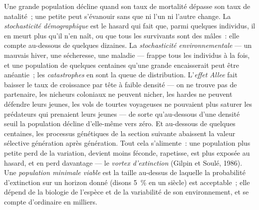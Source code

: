 \begin{definition}\label{def:b3:conservation-biology:small}
Une grande population décline quand son taux de mortalité dépasse son
taux de natalité~; une petite peut s'évanouir sans que ni l'un ni
l'autre change. La \emph{stochasticité démographique} est le hasard
qui fait que, parmi quelques individus, il en meurt plus qu'il n'en
naît, ou que tous les survivants sont des mâles~: elle compte au-dessous
de quelques dizaines. La \emph{stochasticité environnementale} --- un
mauvais hiver, une sécheresse, une maladie --- frappe tous les individus
à la fois, et une population de quelques centaines qu'une grande
encaisserait peut être anéantie~; les \emph{catastrophes} en sont la
queue de distribution. L'\emph{effet Allee} fait baisser le taux de
croissance par tête à faible densité --- on ne trouve pas de partenaire,
les nicheurs coloniaux ne peuvent nicher, les hardes ne peuvent défendre
leurs jeunes, les vols de tourtes voyageuses ne pouvaient plus saturer
les prédateurs qui prenaient leurs jeunes --- de sorte qu'au-dessous
d'une densité seuil la population décline d'elle-même vers zéro. Et
au-dessous de quelques centaines, les processus génétiques de la section
suivante abaissent la valeur sélective génération après génération. Tout
cela s'alimente~: une population plus petite perd de la variation,
devient moins féconde, rapetisse, est plus exposée au hasard, et en perd
davantage --- le \emph{vortex d'extinction} (Gilpin et Soulé, 1986). Une
\emph{population minimale viable} est la taille au-dessus de laquelle la
probabilité d'extinction sur un horizon donné (disons \qty{5}{\%} en un
siècle) est acceptable~; elle dépend de la biologie de l'espèce et de la
variabilité de son environnement, et se compte d'ordinaire en milliers.
\end{definition}

